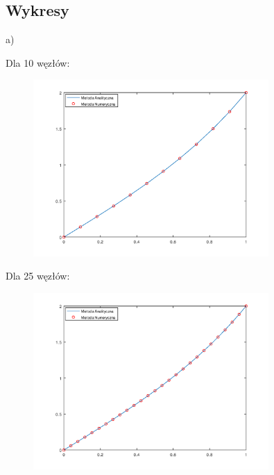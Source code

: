 \begin{samepage}
    
\end{samepage}

\newpage
\subsection{Wykresy}

a)\\
\begin{samepage}
Dla 10 węzłów:

    
    
\FloatBarrier
\begin{figure}[!ht]
    \begin{center}
        \includegraphics[width=0.8\textwidth]{Lab4/charts/zad1/zad1_n_10.png}
    \end{center}
\end{figure}
\FloatBarrier
\end{samepage}

\begin{samepage}
Dla 25 węzłów:
\begin{figure}[!ht]
    \begin{center}
\includegraphics[width=0.8\textwidth]{Lab4/charts/zad1/zad1_n_25.png}
    \end{center}
\end{figure}
\FloatBarrier
\end{samepage}

